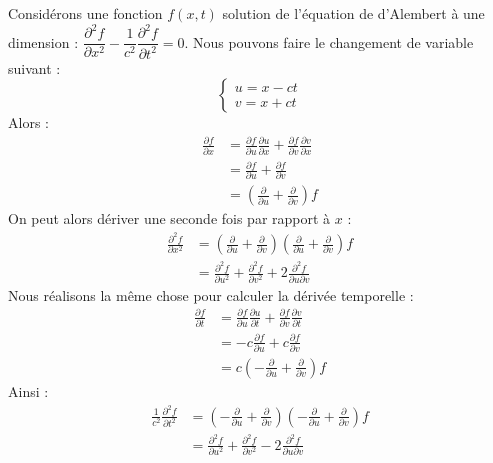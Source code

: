 \documentclass[11pt,fleqn]{book} %
\begin{document}
\begin{demonstration}
	Considérons une fonction $f(x,t)$ solution de l'équation de d'Alembert à une dimension : $\dfrac{\partial^2 f}{\partial x^2} - \dfrac{1}{c^2} \dfrac{\partial^2 f}{\partial t^2} = 0$. Nous pouvons faire le changement de variable suivant :
	\begin{equation}
		\begin{cases}
			u = x-ct \\
			v = x+ct
		\end{cases}
	\end{equation}
	Alors :
	\begin{align}
		\frac{\partial f}{\partial x} &= \frac{\partial f}{\partial u} \frac{\partial u}{\partial x} + \frac{\partial f}{\partial v} \frac{\partial v}{\partial x} \\
		&= \frac{\partial f}{\partial u} + \frac{\partial f}{\partial v}\\
		&= \left( \frac{\partial}{\partial u} + \frac{\partial}{\partial v} \right) f
	\end{align}
	On peut alors dériver une seconde fois par rapport à $x$ :
	\begin{align}
		\frac{\partial^2 f}{\partial x^2} &= \left( \frac{\partial}{\partial u} + \frac{\partial}{\partial v} \right) \left( \frac{\partial}{\partial u} + \frac{\partial}{\partial v} \right) f \\
		&= \frac{\partial^2 f}{\partial u^2} + \frac{\partial^2 f}{\partial v^2} + 2 \frac{\partial^2 f}{\partial u \partial v}
	\end{align}
	Nous réalisons la même chose pour calculer la dérivée temporelle :
	\begin{align}
		\frac{\partial f}{\partial t} &= \frac{\partial f}{\partial u} \frac{\partial u}{\partial t} + \frac{\partial f}{\partial v} \frac{\partial v}{\partial t} \\
		&= -c\frac{\partial f}{\partial u} +c \frac{\partial f}{\partial v}\\
		&= c\left( -\frac{\partial}{\partial u} + \frac{\partial}{\partial v} \right) f
	\end{align}
	Ainsi :
	\begin{align}
		\frac{1}{c^2} \frac{\partial^2 f}{\partial t^2} &= \left( -\frac{\partial}{\partial u} + \frac{\partial}{\partial v} \right) \left( -\frac{\partial}{\partial u} + \frac{\partial}{\partial v} \right) f \\
		&= \frac{\partial^2 f}{\partial u^2} + \frac{\partial^2 f}{\partial v^2} - 2 \frac{\partial^2 f}{\partial u \partial v}

\end{align}
\end{demonstration}
\end{document}
